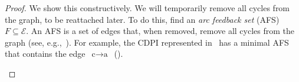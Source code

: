\documentclass[twocolumn,english]{IEEEtran}
\theoremstyle{definition}
\theoremstyle{plain}
\theoremstyle{definition}
\theoremstyle{remark}
\theoremstyle{definition}
\theoremstyle{plain}
\theoremstyle{plain}
\begin{document}
\begin{proof}
We show this constructively. We will temporarily remove all cycles
from the graph, to be reattached later. To do this, find an \emph{arc
feedback set} (AFS) $F\subseteq\mathcal{E}$. An AFS is a set of edges
that, when removed, remove all cycles from the graph (see, e.g.,~\cite{golovach15incremental}).
For example, the CDPI represented in~ has a minimal
AFS that contains the edge~$\text{c}\rightarrow\text{a}$~(). 

\begin{figure}[H]
\hfill{}\hfill{}
\end{figure}
\end{proof}
\end{document}
